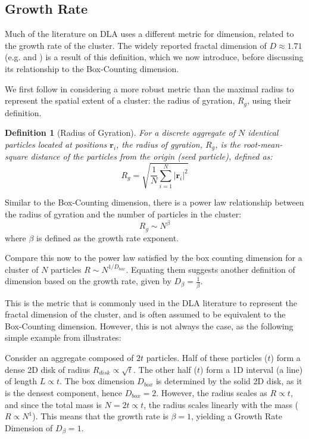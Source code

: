 \documentclass[12pt, a4paper, oneside]{report}
\newtheorem{definition}[theorem]{Definition}
\theoremstyle{remark}
\begin{document}
\subsection{Growth Rate}

Much of the literature on DLA uses a different metric for dimension, related to the growth rate of the cluster. The widely reported fractal dimension of $D \approx 1.71$ (e.g. \cite{ossadnik1991} and \cite{menshutin2006}) is a result of this definition, which we now introduce, before discussing its relationship to the Box-Counting dimension.

We first follow \cite{Grebenkov2017} in considering a more robust metric than the maximal radius to represent the spatial extent of a cluster: the radius of gyration, $R_g$, using their definition. 

\begin{definition}[Radius of Gyration]
For a discrete aggregate of $N$ identical particles located at positions $\mathbf{r}_i$, the radius of gyration, $R_g$, is the root-mean-square distance of the particles from the origin (seed particle), defined as:
\begin{equation*}
    R_g = \sqrt{\frac{1}{N} \sum_{i=1}^N |\mathbf{r}_i |^2}
\end{equation*}
\end{definition}

Similar to the Box-Counting dimension, there is a power law relationship between the radius of gyration and the number of particles in the cluster:
\begin{equation*}
    R_g \sim N^\beta
\end{equation*}
where $\beta$ is defined as the growth rate exponent.

Compare this now to the power law satisfied by the box counting dimension for a cluster of $N$ particles $R \sim N^{1/D_{box}}$. Equating them suggests another definition of dimension based on the growth rate, given by $D_\beta = \frac{1}{\beta}$.

This is the metric that is commonly used in the DLA literature to represent the fractal dimension of the cluster, and is often assumed to be equivalent to the Box-Counting dimension. However, this is not always the case, as the following simple example from \cite{Grebenkov2017} illustrates:

Consider an aggregate composed of $2t$ particles. Half of these particles ($t$) form a dense 2D disk of radius $R_{disk} \propto \sqrt{t}$. The other half ($t$) form a 1D interval (a line) of length $L \propto t$.
The box dimension $D_{box}$ is determined by the solid 2D disk, as it is the densest component, hence $D_{box} = 2$. However, the radius scales as $R \propto t$, and since the total mass is $N = 2t \propto t$, the radius scales linearly with the mass ($R \propto N^1$). This means that the growth rate is $\beta = 1$, yielding a Growth Rate Dimension of $D_\beta = 1$.
\end{document}
